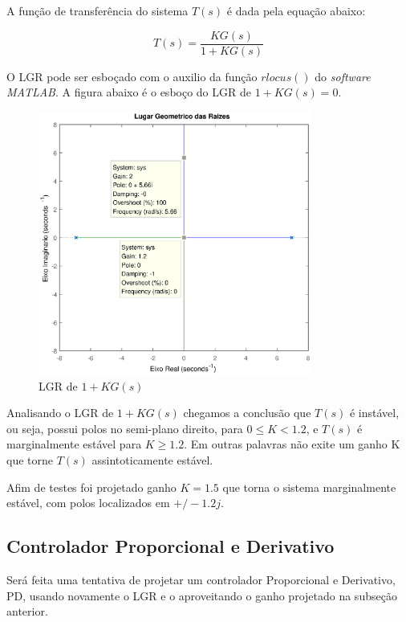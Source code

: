 \documentclass[conference,harvard,brazil,english]{sbatex}
\begin{document}
            A função de transferência do sistema $T(s)$ é dada pela equação abaixo:
            
            \begin{equation}
                T(s) =  \frac{KG(s)}{1+KG(s)}
            \end{equation}
            
            O LGR pode ser esboçado com o auxilio da função $rlocus()$ do \textit{software MATLAB}. A figura abaixo é o esboço do LGR de $1+KG(s)=0$.
            
            \begin{figure}[h]
                \hspace{-10mm}
                \includegraphics[width=9cm]{imagens/graficos/LGR-Kp.eps}
                \caption{LGR de $1+KG(s)$}
            \end{figure}
            
            Analisando o LGR de $1+KG(s)$ chegamos a conclusão que $T(s)$ é instável, ou seja, possui polos no semi-plano direito, para $0\leq K < 1.2$, e $T(s)$ é marginalmente estável para $K\geq1.2$. Em outras palavras não exite um ganho K que torne $T(s)$ assintoticamente estável.
           
            Afim de testes foi projetado ganho $K=1.5$ que torna o sistema marginalmente estável, com polos localizados em $+/-1.2j$.
            
            \subsection{Controlador Proporcional e Derivativo}
            
            Será feita uma tentativa de projetar um controlador Proporcional e Derivativo, PD, usando novamente o LGR e o aproveitando o ganho projetado na subseção anterior.
            
\end{document}
